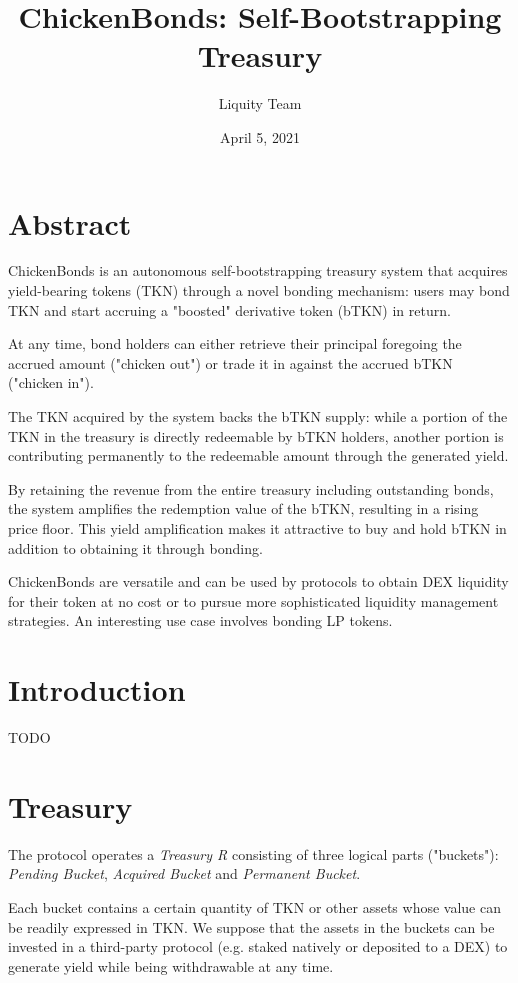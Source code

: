 \documentclass{article}
\begin{document}
\title{\textbf{ChickenBonds: Self-Bootstrapping Treasury}}
\author{Liquity Team}
\date{April 5, 2021}

\maketitle

\section*{Abstract}
ChickenBonds is an autonomous self-bootstrapping treasury system that acquires yield-bearing tokens (TKN) through a novel bonding mechanism: users may bond TKN and start accruing a "boosted" derivative token (bTKN) in return.

At any time, bond holders can either retrieve their principal foregoing the accrued amount ("chicken out") or trade it in against the accrued bTKN ("chicken in").

The TKN acquired by the system backs the bTKN supply: while a portion of the TKN in the treasury is directly redeemable by bTKN holders, another portion is contributing permanently to the redeemable amount through the generated yield.

By retaining the revenue from the entire treasury including outstanding bonds, the system amplifies the redemption value of the bTKN, resulting in a rising price floor. This yield amplification makes it attractive to buy and hold bTKN in addition to obtaining it through bonding. 

ChickenBonds are versatile and can be used by protocols to obtain DEX liquidity for their token at no cost or to pursue more sophisticated liquidity management strategies. An interesting use case involves bonding LP tokens.

\section{Introduction}
TODO

\section{Treasury}
The protocol operates a \textit{Treasury R} consisting of three logical parts ("buckets"):  \textit{Pending Bucket}, \textit{Acquired Bucket} and \textit{Permanent Bucket}.

Each bucket contains a certain quantity of TKN or other assets whose value can be readily expressed in TKN. We suppose that the assets in the buckets can be invested in a third-party protocol (e.g. staked natively or deposited to a DEX) to generate yield while being withdrawable at any time. 
\end{document}
